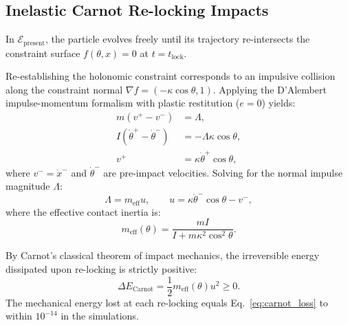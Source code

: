 \documentclass[aps,prc,twocolumn,superscriptaddress,amsmath,amssymb,nofootinbib]{revtex4-2}
\begin{document}
\subsection{Inelastic Carnot Re-locking Impacts}
In \(\mathcal{E}_{\text{present}}\), the particle evolves freely until its trajectory re-intersects the constraint surface \(f(\theta, x) = 0\) at \(t = t_{\text{lock}}\). 

Re-establishing the holonomic constraint corresponds to an impulsive collision along the constraint normal \(\nabla f = (-\kappa\cos\theta, 1)\). Applying the D'Alembert impulse-momentum formalism with plastic restitution (\(e=0\)) yields:
\begin{align}
m (v^+ - v^-) &= \Lambda, \\
I (\dot{\theta}^+ - \dot{\theta}^-) &= -\Lambda \kappa \cos\theta, \\
v^+ &= \kappa \dot{\theta}^+ \cos\theta,
\end{align}
where \(v^- = \dot{x}^-\) and \(\dot{\theta}^-\) are pre-impact velocities. Solving for the normal impulse magnitude \(\Lambda\):
\begin{equation}
\Lambda = m_{\text{eff}} u, \qquad u = \kappa \dot{\theta}^- \cos\theta - v^-,
\end{equation}
where the effective contact inertia is:
\begin{equation}
m_{\text{eff}}(\theta) = \frac{m I}{I + m\kappa^2 \cos^2\theta}.
\end{equation}

By Carnot's classical theorem of impact mechanics, the irreversible energy dissipated upon re-locking is strictly positive:
\begin{equation}
\Delta E_{\text{Carnot}} = \frac{1}{2} m_{\text{eff}}(\theta) u^2 \ge 0.
\label{eq:carnot_loss}
\end{equation}
The mechanical energy lost at each re-locking equals Eq.~\eqref{eq:carnot_loss} to within \(10^{-14}\) in the simulations.
\end{document}
